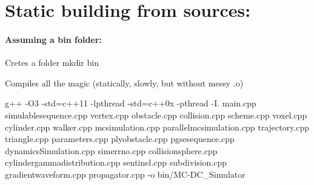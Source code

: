 \section*{Static building from sources\+:}

\paragraph*{Assuming a bin folder\+:}

Cretes a folder {\ttfamily mkdir bin}

Compiles all the magic (statically, slowly, but without messy .o)

{\ttfamily g++ -\/\+O3 -\/std=c++11 -\/lpthread -\/std=c++0x -\/pthread -\/I. main.\+cpp simulablesequence.\+cpp vertex.\+cpp obstacle.\+cpp collision.\+cpp scheme.\+cpp voxel.\+cpp cylinder.\+cpp walker.\+cpp mcsimulation.\+cpp parallelmcsimulation.\+cpp trajectory.\+cpp triangle.\+cpp parameters.\+cpp plyobstacle.\+cpp pgsesequence.\+cpp dynamics\+Simulation.\+cpp simerrno.\+cpp collisionsphere.\+cpp cylindergammadistribution.\+cpp sentinel.\+cpp subdivision.\+cpp gradientwaveform.\+cpp propagator.\+cpp -\/o bin/\+M\+C-\/\+D\+C\+\_\+\+Simulator} 